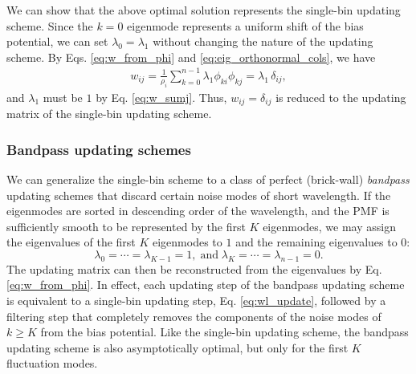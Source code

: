 \documentclass[reprint, superscriptaddress, floatfix]{revtex4-1}
\newcommand{\Err}{E}
\begin{document}
We can show that the above optimal solution
represents the single-bin updating scheme.
%
Since the $k = 0$ eigenmode represents
a uniform shift of the bias potential,
we can set $\lambda_0 = \lambda_1$
without changing the nature of the updating scheme.
%
By Eqs. \eqref{eq:w_from_phi} and
\eqref{eq:eig_orthonormal_cols}, we have
\begin{align*}
  w_{ij}
  = \frac{1}{\rho_i} \sum_{k=0}^{n-1} \lambda_1 \phi_{ki} \phi_{kj}
  = \lambda_1 \, \delta_{ij}
  ,
\end{align*}
and $\lambda_1$ must be $1$ by Eq. \eqref{eq:w_sumj}.
%
Thus, $w_{ij} = \delta_{ij}$
is reduced to the updating matrix of the single-bin updating scheme.
%
%
%
%
%




\subsubsection{\label{sec:bandpass}
Bandpass updating schemes}


We can generalize
the single-bin scheme to a class of
perfect (brick-wall) \emph{bandpass} updating schemes
that discard certain noise modes
of short wavelength.
%
If the eigenmodes are sorted in descending order
of the wavelength,
and the PMF is sufficiently smooth
to be represented by the first $K$
eigenmodes,
we may assign the eigenvalues of the first $K$ eigenmodes to $1$
and the remaining eigenvalues to $0$:
%
\begin{equation}
  \lambda_0 = \cdots = \lambda_{K-1} = 1
  ,
  \mathrm{\; and \;}
  \lambda_K = \cdots = \lambda_{n-1} = 0
  .
  \label{eq:lambda_bandpass}
\end{equation}
%
The updating matrix can then be reconstructed
from the eigenvalues by Eq. \eqref{eq:w_from_phi}.
%
%
In effect, each updating step of the bandpass updating scheme
is equivalent to a single-bin updating step,
Eq. \eqref{eq:wl_update},
followed by a filtering step
that completely removes the components of the noise modes of $k \ge K$
from the bias potential.
%
%
Like the single-bin updating scheme,
the bandpass updating scheme is also
asymptotically optimal,
but only for the first $K$ fluctuation modes.
\end{document}
